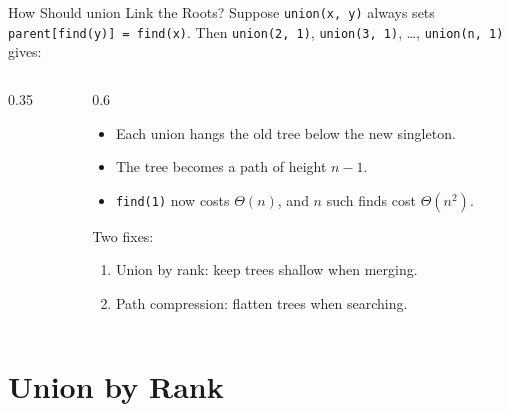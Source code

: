 \documentclass[10pt,aspectratio=169]{beamer}
\begin{document}
\begin{frame}{How Should union Link the Roots?}
  Suppose \texttt{union(x, y)} always sets \texttt{parent[find(y)] = find(x)}.
  Then \texttt{union(2, 1)}, \texttt{union(3, 1)}, \ldots,
  \texttt{union(n, 1)} gives:

  \begin{columns}[c]
    \begin{column}{0.35\textwidth}
      \begin{center}
      \end{center}
    \end{column}
    \begin{column}{0.6\textwidth}
      \begin{itemize}
        \item Each union hangs the old tree below the new singleton.
        \item The tree becomes a path of height $n - 1$.
        \item \texttt{find(1)} now costs $\Theta(n)$, and $n$ such finds cost
              $\Theta(n^2)$.
      \end{itemize}

      \bigskip
      Two fixes:
      \begin{enumerate}
        \item \alert{Union by rank}: keep trees shallow when merging.
        \item \alert{Path compression}: flatten trees when searching.
      \end{enumerate}
    \end{column}
  \end{columns}
\end{frame}

\section{Union by Rank}
\end{document}

